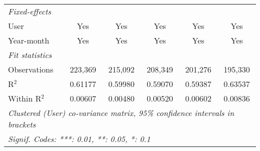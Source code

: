 \begin{table}[htbp]
\begin{threeparttable}[b]
\begin{tabular}{lccccc}
         \emph{Fixed-effects}\\
         User                         & Yes              & Yes              & Yes              & Yes              & Yes\\  
         Year-month                   & Yes              & Yes              & Yes              & Yes              & Yes\\  
         \midrule
         \emph{Fit statistics}\\
         Observations                 & 223,369          & 215,092          & 208,349          & 201,276          & 195,330\\  
         R$^2$                        & 0.61177          & 0.59980          & 0.59070          & 0.59387          & 0.63537\\  
         Within R$^2$                 & 0.00607          & 0.00480          & 0.00520          & 0.00602          & 0.00836\\  
         \midrule \midrule
         \multicolumn{6}{l}{\emph{Clustered (User) co-variance matrix, 95\% confidence intervals in brackets}}\\
         \multicolumn{6}{l}{\emph{Signif. Codes: ***: 0.01, **: 0.05, *: 0.1}}\\
      \end{tabular}
   \end{threeparttable}
\end{table}


